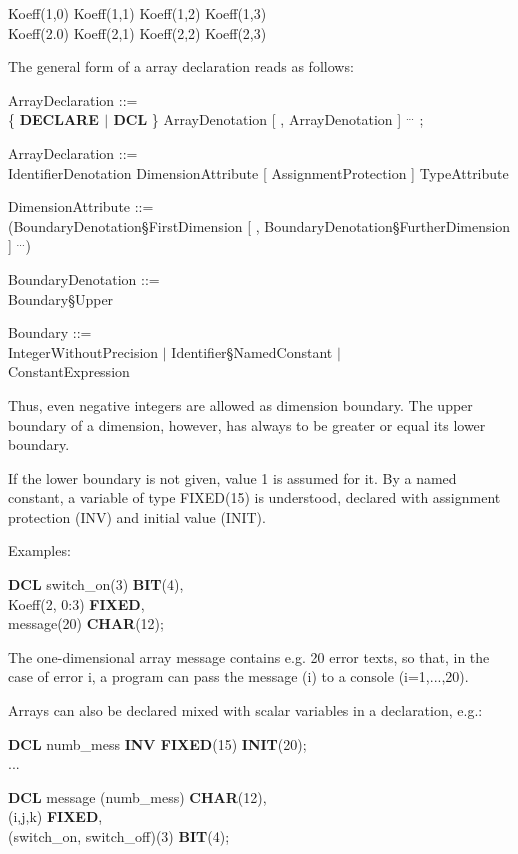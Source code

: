 Koeff(1,0) \x  Koeff(1,1) \x  Koeff(1,2) \x  Koeff(1,3) \\
Koeff(2.0) \x  Koeff(2,1) \x  Koeff(2,2) \x  Koeff(2,3)

The general form of a array declaration reads as follows:

ArrayDeclaration ::=\\
\x \{ {\bf DECLARE $\mid$ DCL} \} ArrayDenotation [ , ArrayDenotation ] $^{...}$ ;

ArrayDeclaration ::=\\
\x IdentifierDenotation DimensionAttribute [ AssignmentProtection ] TypeAttribute\\
\x [ GlobalAttribute ] [ InitialisationAttribute ]

DimensionAttribute ::=\\
\x (BoundaryDenotation\S FirstDimension [ , BoundaryDenotation\S FurtherDimension ] $^{...}$)

BoundaryDenotation ::=\\
 Boundary\S Upper

Boundary ::=\\
\x [ - ] IntegerWithoutPrecision $\mid$ Identifier\S NamedConstant $\mid$ \\
\x ConstantExpression

Thus, even negative integers are allowed as dimension boundary. The
upper boundary of a dimension, however, has always to be greater or
equal its lower boundary.

If the lower boundary is not given, value 1 is assumed for it. By a
named constant, a variable of type FIXED(15) is understood, declared
with assignment protection (INV) and initial value (INIT).

Examples:

{\bf DCL} switch\_on(3) {\bf BIT}(4),\\
\x Koeff(2, 0:3) {\bf FIXED},\\
\x message(20) {\bf CHAR}(12);

The one-dimensional array message contains e.g. 20 error texts, so that,
in the case of error i, a program can pass the message (i) to a console
(i=1,...,20).

Arrays can also be declared mixed with scalar variables in a declaration,
e.g.:

{\bf DCL} numb\_mess {\bf INV FIXED}(15) {\bf INIT}(20);\\
\x ...

{\bf DCL}  message (numb\_mess) {\bf CHAR}(12),\\
\x (i,j,k) {\bf FIXED},\\
\x (switch\_on, switch\_off)(3) {\bf BIT}(4);

